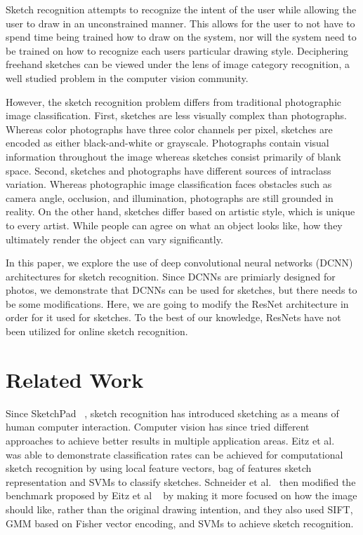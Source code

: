 \documentclass[10pt,twocolumn,letterpaper]{article}
\begin{document}
Sketch recognition attempts to recognize the intent of the user while allowing the user to draw in an unconstrained manner. This allows for the user to not have to spend time being trained how to draw on the system, nor will the system need to be trained on how to recognize each users particular drawing style. Deciphering freehand sketches can be viewed under the lens of image category recognition, a well studied problem in the computer vision community.  

However, the sketch recognition problem differs from traditional photographic image classification. First, sketches are less visually complex than photographs. Whereas color photographs have three color channels per pixel, sketches are encoded as either black-and-white or grayscale. Photographs contain visual information throughout the image whereas sketches consist primarily of blank space. Second, sketches and photographs have different sources of intraclass variation. Whereas photographic image classification faces obstacles such as camera angle, occlusion, and illumination, photographs are still grounded in reality. On the other hand, sketches differ based on artistic style, which is unique to every artist. While people can agree on what an object looks like, how they ultimately render the object can vary significantly.

In this paper, we explore the use of deep convolutional neural networks (DCNN) architectures for sketch recognition. Since DCNNs are primiarly designed for photos, we demonstrate that DCNNs can be used for sketches, but there needs to be some modifications. Here, we are going to modify the ResNet architecture in order for it used for sketches. To the best of our knowledge, ResNets have not been utilized for online sketch recognition.


\section{Related Work}

Since SketchPad ~\cite{sutherland1964sketchpad}, sketch recognition has introduced sketching as a means of human computer interaction. Computer vision has since tried different approaches to achieve better results in multiple application areas. Eitz et al. ~\cite{eitz2012hdhso} was able to demonstrate classification rates can be achieved for computational sketch recognition by using local feature vectors, bag of features sketch representation and SVMs to classify sketches. Schneider et al.~\cite{schneider2014sketch} then modified the benchmark proposed by Eitz et al ~\cite{eitz2012hdhso}  by making it more focused on how the image should like, rather than the original drawing intention, and they also used SIFT, GMM based on Fisher vector encoding, and SVMs to achieve sketch recognition.
\end{document}
